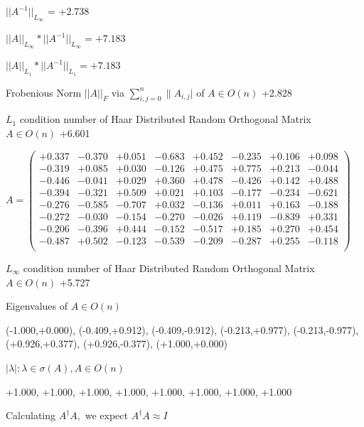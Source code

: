 \documentclass[9pt]{article}
\theoremstyle{plain}
\theoremstyle{definition}
\theoremstyle{remark}
\numberwithin{equation}{section}
\begin{document}
$||A^{-1}||_{L_{\infty}}$ = +2.738

$||A||_{L_{\infty}} * ||A^{-1}||_{L_{\infty}} = +7.183$

$||A||_{L_1} * ||A^{-1}||_{L_1} = +7.183$

Frobenious Norm  $||A||_{\textit{F}}$ via $\sum\limits_{i,j =0}^{n} \|A_{i,j}|$   of  $A \in O(n)$  +2.828

$L_1$ condition number of Haar Distributed Random Orthogonal Matrix $A \in O(n)$ +6.601

$A = \left(
\begin{array}{
cccccccc}
+0.337 & -0.370 & +0.051 & -0.683 & +0.452 & -0.235 & +0.106 & +0.098 \\
-0.319 & +0.085 & +0.030 & -0.126 & +0.475 & +0.775 & +0.213 & -0.044 \\
-0.446 & -0.041 & +0.029 & +0.360 & +0.478 & -0.426 & +0.142 & +0.488 \\
-0.394 & -0.321 & +0.509 & +0.021 & +0.103 & -0.177 & -0.234 & -0.621 \\
-0.276 & -0.585 & -0.707 & +0.032 & -0.136 & +0.011 & +0.163 & -0.188 \\
-0.272 & -0.030 & -0.154 & -0.270 & -0.026 & +0.119 & -0.839 & +0.331 \\
-0.206 & -0.396 & +0.444 & -0.152 & -0.517 & +0.185 & +0.270 & +0.454 \\
-0.487 & +0.502 & -0.123 & -0.539 & -0.209 & -0.287 & +0.255 & -0.118 \\
\end{array}
\right)$ \newline 

$L_{\infty}$ condition number of Haar Distributed Random Orthogonal Matrix $A \in O(n)$ +5.727

Eigenvalues of $A \in O(n)$

(-1.000,+0.000), (-0.409,+0.912), (-0.409,-0.912), (-0.213,+0.977), (-0.213,-0.977), (+0.926,+0.377), (+0.926,-0.377), (+1.000,+0.000)

 $|\lambda | : \lambda \in \sigma(A) , A \in O(n)$

+1.000, +1.000, +1.000, +1.000, +1.000, +1.000, +1.000, +1.000


Calculating $A^{\dag} A,$  we expect $A^{\dag} A \approx I$
\end{document}
